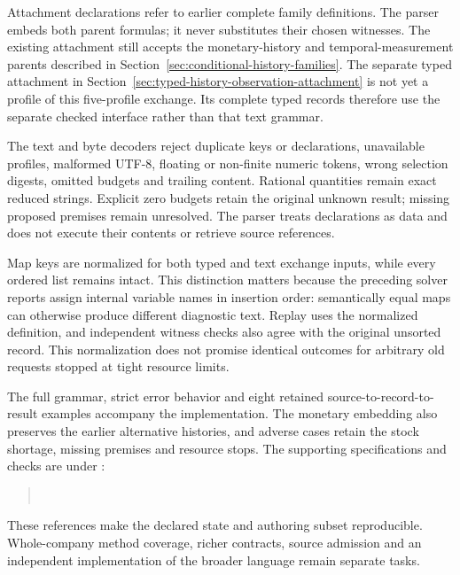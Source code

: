 Attachment declarations refer to earlier complete family definitions. The
parser embeds both parent formulas; it never substitutes their chosen witnesses.
The existing attachment still accepts the monetary-history and temporal-measurement
parents described in Section~\ref{sec:conditional-history-families}.
The separate typed attachment in Section~\ref{sec:typed-history-observation-attachment}
is not yet a profile of this five-profile exchange. Its complete typed records
therefore use the separate checked interface rather than that text grammar.

The text and byte decoders reject duplicate keys or declarations, unavailable
profiles, malformed UTF-8, floating or non-finite numeric tokens, wrong selection
digests, omitted budgets and trailing content. Rational quantities remain exact
reduced strings. Explicit zero budgets retain the original unknown result;
missing proposed premises remain unresolved. The parser treats declarations
as data and does not execute their contents or retrieve source references.

Map keys are normalized for both typed and text exchange inputs, while every
ordered list remains intact. This distinction matters because the preceding
solver reports assign internal variable names in insertion order: semantically
equal maps can otherwise produce different diagnostic text. Replay uses the
normalized definition, and independent witness checks also agree with the
original unsorted record. This normalization does not promise identical outcomes
for arbitrary old requests stopped at tight resource limits.

The full grammar, strict error behavior and eight retained source-to-record-to-result
examples accompany the implementation. The monetary embedding also preserves
the earlier alternative histories, and adverse cases retain the stock shortage,
missing premises and resource stops. The supporting specifications and checks
are under :
\begin{quote}\small
{}\\
\end{quote}
These references make the declared state and authoring subset reproducible.
Whole-company method coverage, richer contracts, source admission and an
independent implementation of the broader language remain separate tasks.
